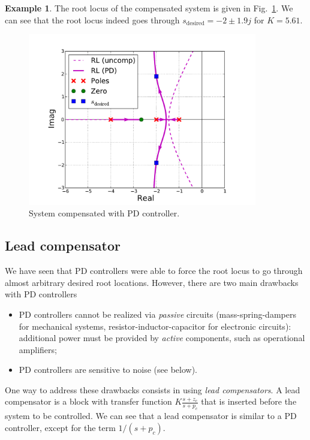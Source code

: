 \documentclass[a4paper,11pt]{report}
\theoremstyle{definition}
\newcommand{\des}{\textrm{desired}}
\newtheorem{mdexample}{Example}
\newenvironment{example}%
  {\vspace{0.1cm}\begin{mdframed}[backgroundcolor=lightgray]\begin{mdexample}}%
  {\end{mdexample}\end{mdframed}\vspace{0.1cm}}
\begin{document}
\begin{example}
  The root locus of the compensated system is given in
  Fig.~\ref{fig:design-PD}. We can see that the root locus indeed goes
  through $s_\des=-2\pm1.9j$ for $K=5.61$.

  \begin{figure}[H]
    \centering
    \includegraphics[width=10cm]{fig/design-PD.pdf}
    \caption{System compensated with PD controller.}
    \label{fig:design-PD}
  \end{figure}


\end{example}

\subsection{Lead compensator}
\label{sec:lead}

We have seen that PD controllers were able to force the root locus to
go through almost arbitrary desired root locations. However, there are
two main drawbacks with PD controllers
\begin{itemize}
\item PD controllers cannot be realized via \emph{passive} circuits
  (mass-spring-dampers for mechanical systems,
  resistor-inductor-capacitor for electronic circuits): additional
  power must be provided by \emph{active} components, such as
  operational amplifiers;
\item PD controllers are sensitive to noise (see below).
\end{itemize}

One way to address these drawbacks consists in using \emph{lead
  compensators}. A lead compensator is a block with transfer function
$K\frac{s+z_c}{s+p_c}$ that is inserted before the system to be
controlled. We can see that a lead compensator is similar to a PD
controller, except for the term $1/(s+p_c)$.
\end{document}
